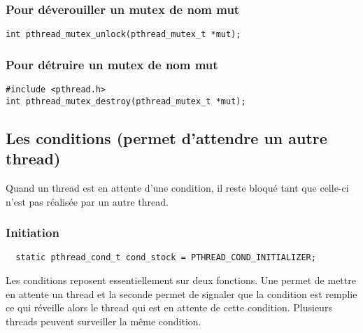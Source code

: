 \documentclass[a4paper]{article}
\begin{document}
\subsubsection{Pour déverouiller un mutex de nom mut}
\begin{lstlisting}
int pthread_mutex_unlock(pthread_mutex_t *mut);
\end{lstlisting}
\subsubsection{Pour détruire un mutex de nom mut}
\begin{lstlisting}
#include <pthread.h>
int pthread_mutex_destroy(pthread_mutex_t *mut);
\end{lstlisting}
\subsection{Les conditions (permet d'attendre un autre thread)}
Quand un thread est en attente d'une condition, il reste bloqué tant que celle-ci n'est pas réalisée par un autre thread.
\subsubsection{Initiation}
\begin{lstlisting}
  static pthread_cond_t cond_stock = PTHREAD_COND_INITIALIZER;
\end{lstlisting}
Les conditions reposent essentiellement sur deux fonctions. Une permet de mettre en attente un thread et la seconde permet de signaler que la condition est remplie ce qui réveille alors le thread qui est en attente de cette condition. Plusieurs threads peuvent surveiller la même condition.
\newpage
\end{document}
